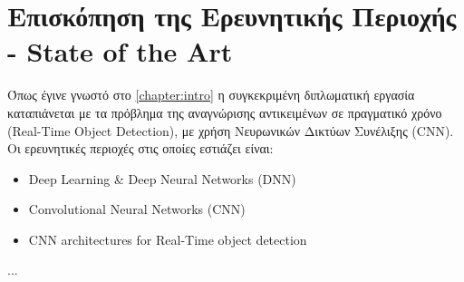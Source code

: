 \chapter{Επισκόπηση της Ερευνητικής Περιοχής - State of the Art}
\label{chapter:sota}
Όπως έγινε γνωστό στο \autoref{chapter:intro} η συγκεκριμένη διπλωματική εργασία
καταπιάνεται με τα πρόβλημα της αναγνώρισης αντικειμένων σε πραγματικό χρόνο (Real-Time Object Detection), με χρήση Νευρωνικών Δικτύων Συνέλιξης (CNN).
Οι ερευνητικές περιοχές στις οποίες εστιάζει είναι:

\begin{itemize}
  \item{Deep Learning \& Deep Neural Networks (DNN)}
  \item{Convolutional Neural Networks (CNN)}
  \item{CNN architectures for Real-Time object detection}
\end{itemize}
...

%
%

